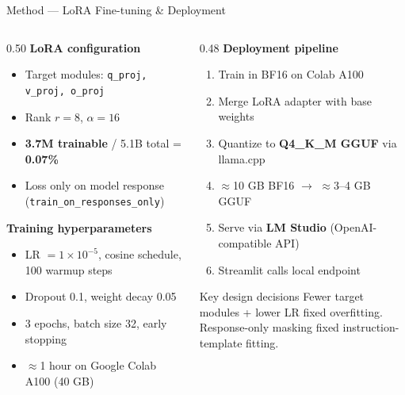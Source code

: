 \documentclass[aspectratio=169,11pt]{beamer}
\newcommand{\highlight}[1]{\textcolor{accentblue}{\textbf{#1}}}
\begin{document}
\begin{frame}{Method --- LoRA Fine-tuning \& Deployment}
\begin{columns}[T]
\begin{column}{0.50\textwidth}
  \small
  \textbf{LoRA configuration}
  \begin{itemize}
    \setlength\itemsep{0.1em}
    \item Target modules: \texttt{q\_proj, v\_proj, o\_proj}
    \item Rank $r=8$, $\alpha=16$
    \item \highlight{3.7M trainable} / 5.1B total = \textbf{0.07\%}
    \item Loss only on model response (\texttt{train\_on\_responses\_only})
  \end{itemize}
  \textbf{Training hyperparameters}
  \begin{itemize}
    \setlength\itemsep{0.1em}
    \item LR $= 1{\times}10^{-5}$, cosine schedule, 100 warmup steps
    \item Dropout 0.1, weight decay 0.05
    \item 3 epochs, batch size 32, early stopping
    \item $\approx$1 hour on Google Colab A100 (40 GB)
  \end{itemize}
\end{column}
\begin{column}{0.48\textwidth}
  \small
  \textbf{Deployment pipeline}
  \begin{enumerate}
    \setlength\itemsep{0.15em}
    \item Train in BF16 on Colab A100
    \item Merge LoRA adapter with base weights
    \item Quantize to \highlight{Q4\_K\_M GGUF} via llama.cpp
    \item $\approx$10 GB BF16 $\to$ $\approx$3--4 GB GGUF
    \item Serve via \textbf{LM Studio} (OpenAI-compatible API)
    \item Streamlit calls local endpoint
  \end{enumerate}
  \begin{block}{Key design decisions}
    \small
    Fewer target modules + lower LR fixed overfitting.\\
    Response-only masking fixed instruction-template fitting.
  \end{block}
\end{column}
\end{columns}
\end{frame}
\end{document}
